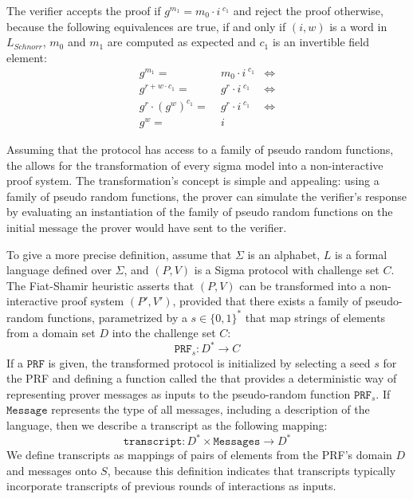 \begin{example}
The verifier accepts the proof if $g^{m_1} = m_0\cdot i^{\;c_1}$ and reject the proof otherwise, because the following equivalences are true, if and only if $(i,w)$ is a word in $L_{Schnorr}$, $m_0$ and $m_1$ are computed as expected and $c_1$ is an invertible field element:
\begin{align*}
g^{m_1} =\; & m_0\cdot i^{\;c_1} & \Leftrightarrow\\
g^{r+w\cdot c_1} =\; & g^{r} \cdot i^{\;c_1} &\Leftrightarrow \\
g^r \cdot (g^w)^{c_1} =\; & g^{r} \cdot i^{\;c_1} & \Leftrightarrow \\
g^w =\; & i
\end{align*}
\end{example}
Assuming that the protocol has access to a family of pseudo random functions, the  allows for the transformation of every sigma model into a non-interactive proof system. The transformation's concept is simple and appealing: using a family of pseudo random functions, the prover can simulate the verifier's response by evaluating an instantiation of the family of pseudo random functions on the initial message the prover would have sent to the verifier.

To give a more precise definition, assume that $\Sigma$ is an alphabet, $L$ is a formal language defined over $\Sigma$, and $(P,V)$ is a Sigma protocol with challenge set $C$. The Fiat-Shamir heuristic asserts that $(P,V)$ can be transformed into a non-interactive proof system $(P',V')$, provided that there exists a family of pseudo-random functions, parametrized by a  $s\in\{0,1\}^*$ that map strings of elements from a domain set $D$ into the challenge set $C$:
\begin{equation}
\mathtt{PRF}_s: D^* \to C    
\end{equation}
If a $\mathtt{PRF}$ is given, the transformed protocol is initialized by selecting a seed $s$ for the PRF and defining a function called the  that provides a deterministic way of representing prover messages as inputs to the pseudo-random function $\mathtt{PRF}_s$. If $\mathtt{Message}$ represents the type of all messages, including a description of the language, then we describe a transcript as the following mapping:
\begin{equation}
\mathtt{transcript}: D^*\times\mathtt{Messages} \to D^*    
\end{equation}
We define transcripts as mappings of pairs of elements from the PRF's domain $D$ and messages onto $S$, because this definition indicates that transcripts typically incorporate transcripts of previous rounds of interactions as inputs.

